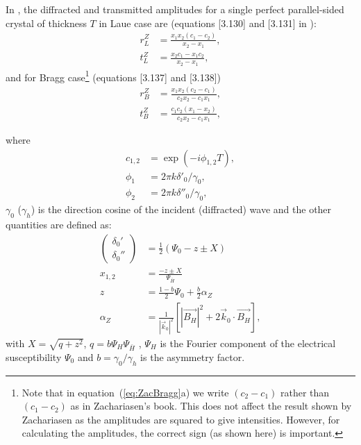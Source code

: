 \documentclass[preprint]{iucr}              %
\begin{document}
In \cite{ZachariasenBook}, the diffracted and transmitted amplitudes for a single perfect parallel-sided crystal of thickness $T$ in Laue case are (equations [3.130] and [3.131] in \cite{ZachariasenBook}):
 	\begin{subequations}
    \label{eq:ZacLaue}
    \begin{align}
    r^Z_L &= \frac{x_1 x_2 (c_1 - c_2)}{x_2-x_1}, \\
    t^Z_L &= \frac{x_2 c_1 - x_1 c_2}{x_2-x_1},
    \end{align}
	\end{subequations}
and for Bragg case\footnote{Note that in equation~(\ref{eq:ZacBragg}a) we write $(c_2-c_1)$ rather than $(c_1-c_2)$ as in Zachariasen's book. This does not affect the result shown by Zachariasen as the amplitudes are squared to give intensities. However, for calculating the amplitudes, the correct sign (as shown here) is important.} (equations [3.137] and [3.138]) 
	\begin{subequations}
	\label{eq:ZacBragg}
    \begin{align}
	r^Z_{B} &=  
	\frac{x_1 x_2 (c_2 - c_1)}{c_2 x_2-c_1 x_1}, \\
 	t^Z_{B} &=  
	\frac{c_1 c_2 (x_1 - x_2)}{c_2 x_2-c_1 x_1},    
    \end{align}
    \end{subequations}


where
\begin{subequations}
\begin{align}
c_{1,2} &=\exp(-i \phi_{1,2} T), \\
\phi_1 &= 2\pi k \delta'_0/\gamma_0, \\
\phi_2 &= 2\pi k \delta''_0/\gamma_0,
\end{align}
\end{subequations}
$\gamma_0$ ($\gamma_h$) is the direction cosine of the incident (diffracted) 
wave and the other quantities are defined as:
\begin{subequations}
\begin{align}
	\left( \begin{array}{ll}
               \delta_0' \\
               \delta_0''
	       \end{array} 
	\right)
	&= \frac{1}{2} \left( \Psi_0 - z\pm X \right)
\\
    x_{1,2}
	&= \frac{- z\pm X}{\Psi_{\bar{H}}}
 \\
	z &= \frac{1-b}{2} \Psi_0 + \frac{b}{2} \alpha_Z 
 \\
	\alpha_Z &= \frac{1}{|\vec{k}_0|^2} 
              \left[ |\vec{B_H}|^2 +
	       2 \vec{k}_0 \cdot \vec{B_H} \right],
\end{align}
\end{subequations}
with $X=\sqrt{q+z^2}$, $q=b\Psi_H\Psi_{\bar{H}}$ , 
$\Psi_H$ is the Fourier component of the
electrical susceptibility $\Psi_0$ and $b=\gamma_0/\gamma_h$ is the asymmetry
factor.
\end{document}
